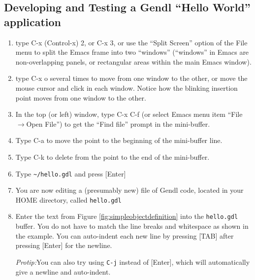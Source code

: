 \documentclass [11pt]{book}
\begin{document}
\subsection{Developing and Testing a Gendl ``Hello World'' application}

\label{subsec:developingandtestingagendlhelloworldapplication}

 

\begin{enumerate}

\item type C-x (Control-x) 2, or C-x 3, or use the ``Split
Screen'' option of the File menu to split the Emacs frame into two
``windows'' (``windows'' in Emacs are non-overlapping panels, or
rectangular areas within the main Emacs window).

\item type C-x o several times to move from one window to
the other, or move the mouse cursor and click in each window. Notice
how the blinking insertion point moves from one window to the other.

\item In the top (or left) window, type C-x C-f (or select Emacs menu item
``File$\rightarrow$Open File'') to get the ``Find file'' prompt in the
mini-buffer.

\item Type C-a to move the point to the beginning of the mini-buffer line.

\item Type C-k to delete from the point to the end of the mini-buffer.

\item Type \texttt{\textasciitilde/hello.gdl} and press [Enter]

\item You are now editing a (presumably new) file of Gendl
	 code, located in your HOME directory, called \texttt{hello.gdl}

\item Enter the text from Figure 
\ref{fig:simpleobjectdefinition} into the \texttt{hello.gdl} buffer. You do not have to match the line breaks and whitespace as shown in the example.
You can auto-indent each new line by pressing [TAB] after pressing [Enter] for the newline.

\emph{Protip:}You can also try using \texttt{C-j} instead of [Enter], which will automatically give a newline and auto-indent.



\begin{figure}
\begin{lrbox}{\boxedverb}
\begin{minipage}{\linewidth}


\end{minipage}
\end{lrbox}
\end{figure}
\end{enumerate}
\end{document}
